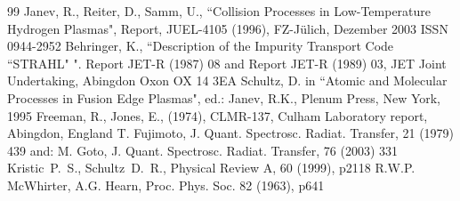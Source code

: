 \documentclass[12pt,dvipdfmx]{article}
\begin{document}
\begin{thebibliography}{99}
 Janev, R., Reiter, D., Samm, U.,
                   ``Collision Processes in Low-Temperature
Hydrogen Plasmas", Report, JUEL-4105 (1996), FZ-J\"ulich, Dezember 2003
ISSN 0944-2952
 Behringer, K.,
``Description of the Impurity Transport Code ``STRAHL" ".
Report JET-R (1987) 08 and
Report JET-R (1989) 03, JET Joint Undertaking, Abingdon Oxon OX 14 3EA
 Schultz, D. in ``Atomic and Molecular Processes in Fusion
                     Edge Plasmas", ed.: Janev, R.K., Plenum Press, New York, 1995
 Freeman, R., Jones, E., (1974), CLMR-137, Culham Laboratory report, Abingdon, England
 T.  Fujimoto, J. Quant. Spectrosc. Radiat. Transfer, 21 (1979) 439 and:
M. Goto, J. Quant. Spectrosc. Radiat. Transfer, 76 (2003) 331
 Kristic~P.~S., Schultz~D.~R., Physical Review A, 60 (1999), p2118
 R.W.P. McWhirter, A.G. Hearn, Proc. Phys. Soc. 82 (1963), p641
 \end{thebibliography}
\end{document}
